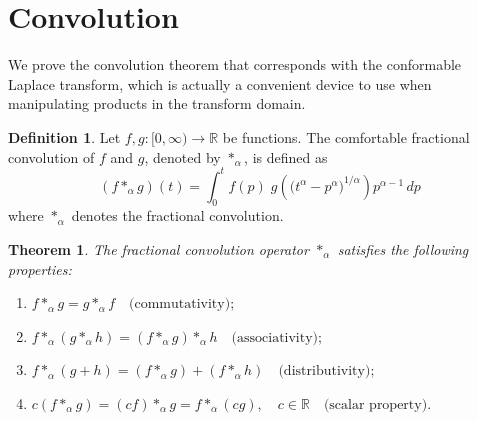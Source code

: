 \documentclass[two side,reqno,12pt]{amsart}
\numberwithin{equation}{section}
\newtheorem{theorem}[lemma]{Theorem}
\theoremstyle{definition}
\newtheorem{definition}[lemma]{Definition}
\begin{document}
\section{Convolution }
We prove the convolution theorem that corresponds with the conformable Laplace transform, which is actually a convenient device to use when manipulating products in the transform domain.
\begin{definition}
     Let \( f, g : [0, \infty) \to \mathbb{R} \) be functions. The comfortable fractional convolution of 
\( f \) and \( g \), denoted by \( *_{\alpha} \), is defined as
\[
(f *_{\alpha} g)(t) = \int_{0}^{t} f(p) \; g\!\left( \big( t^{\alpha} - p^{\alpha}\big)^{1/\alpha} \right) p^{\alpha-1} \, dp \tag{5.1}
\]
where \(*_{\alpha}\) denotes the fractional convolution.
\end{definition}
\begin{theorem}
The fractional convolution operator \( *_{\alpha} \) satisfies the following properties:
\begin{enumerate}
    \item 
    $ f *_{\alpha} g = g *_{\alpha} f  \quad\text{(commutativity)}; $
     \item
    $
    f *_{\alpha} (g *_{\alpha} h) = (f *_{\alpha} g) *_{\alpha} h\quad\text{(associativity)};
    $
    \item 
    $
    f *_{\alpha} (g + h) = (f *_{\alpha} g) + (f *_{\alpha} h) \quad\text{(distributivity)};
    $
     \item 
   $c(f *_{\alpha} g) = (cf) *_{\alpha} g = f *_{\alpha} (cg), \quad c \in \mathbb{R} \quad\text{(scalar property)}.$
\end{enumerate}
\end{theorem}
\end{document}
